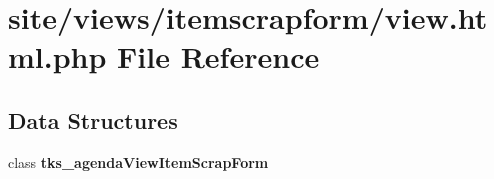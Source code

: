 \section{site/views/itemscrapform/view.html.\+php File Reference}
\label{site_2views_2itemscrapform_2view_8html_8php}
\subsection*{Data Structures}
\begin{DoxyCompactItemize}
\item 
class \textbf{ tks\+\_\+agenda\+View\+Item\+Scrap\+Form}
\end{DoxyCompactItemize}
